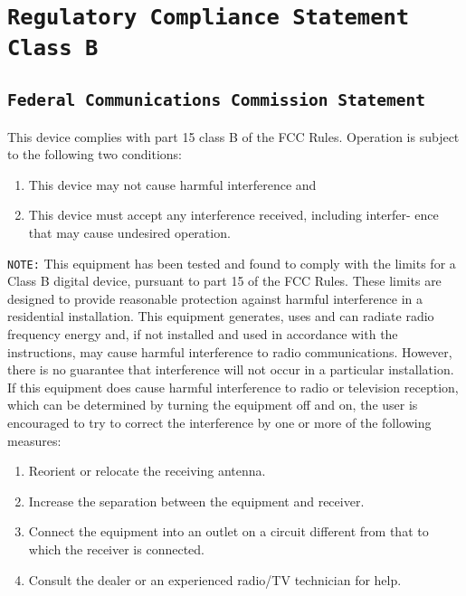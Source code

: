 %
%
%
%
%




\section{\texttt{Regulatory Compliance Statement Class B}}

\subsection{\texttt{Federal Communications Commission Statement}}

This device complies with part 15 class B of the FCC Rules. Operation is
subject to the following two conditions:
\begin{enumerate}
\item This device may not cause harmful interference and
\item This device must accept any interference received, including interfer-
ence that may cause undesired operation.
\end{enumerate}


\texttt{NOTE:} This equipment has been tested and found to comply with the
limits for a Class B digital device, pursuant to part 15 of the FCC Rules.
These limits are designed to provide reasonable protection against harmful
interference in a residential installation. This equipment generates, uses
and can radiate radio frequency energy and, if not installed and used in
accordance with the instructions, may cause harmful interference to radio
communications. However, there is no guarantee that interference will not
occur in a particular installation. If this equipment does cause harmful
interference to radio or television reception, which can be determined by
turning the equipment off and on, the user is encouraged to try to correct
the interference by one or more of the following measures:
\begin{enumerate}
\item Reorient or relocate the receiving antenna.
\item Increase the separation between the equipment and receiver.
\item Connect the equipment into an outlet on a circuit different from that
to which the receiver is connected.
\item Consult the dealer or an experienced radio/TV technician for help.
\end{enumerate}

